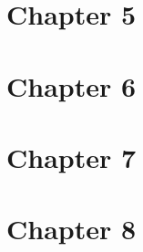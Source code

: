 \documentclass{wileySix}
\begin{document}
\chapter{Chapter 5}
%
%
%
%
%
%
%
%
%
%
%
%
%
%
%
%
%

\chapter{Chapter 6}
%
%
%
%
%
%
%
%
%
%
%
%
%
%
%
%

\chapter{Chapter 7}
%
%
%
%
%
%
%
%
%
%
%
%
%
%
%
%
%
%

\chapter{Chapter 8}
%
%
%
%
%
%
%
%
%
%
%
%
%
%
%
%
%
%

\end{document}
